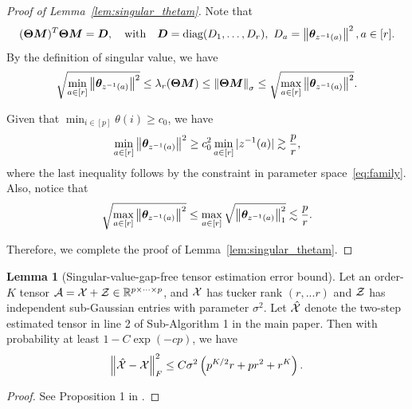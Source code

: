 \documentclass[lettersize,journal]{IEEEtran}
\theoremstyle{definition}
\newtheorem{lem}{Lemma}
\theoremstyle{definition}
\newcommand{\of}[1]{\left(#1\right)}
\begin{document}
\begin{proof}[Proof of Lemma~\ref{lem:singular_thetam}] Note that 
\begin{equation}
    (\boldsymbol{\Theta}\bm M)^T \boldsymbol{\Theta} \bm M = \bm{D}, \quad \text{with} \quad \bm{D} = \text{diag}(D_1,\ldots, D_r), \ D_a = \left\lVert\boldsymbol{\theta}_{z^{-1}(a)}\right\rVert^2, a \in [r].
\end{equation}
By the definition of singular value, we have 
\begin{equation}
     \sqrt{\min_{a \in [r]}\left\lVert \boldsymbol{\theta}_{ z^{-1}(a)} \right\rVert^2 } \leq \lambda_r(\boldsymbol{\Theta} \bm M) \leq \left\lVert\boldsymbol{\Theta}\bm M\right\rVert_{\sigma} \leq \sqrt{ \max_{a \in [r]}\left\lVert \boldsymbol{\theta}_{ z^{-1}(a)} \right\rVert^2}.
\end{equation}


Given that $\min_{i \in [p]}\theta(i) \geq c_0$, we have  
\begin{equation}
   \min_{a \in [r]} \left\lVert \boldsymbol{\theta}_{ z^{-1}(a)} \right\rVert^2 \geq c_0^2 \min_{a \in [r]} |z^{-1}(a)| \gtrsim \frac{p}{r},
\end{equation}
where the last inequality follows by the constraint in parameter space~\eqref{eq:family}. Also, notice that 
\begin{equation}
    \sqrt{\max_{a \in [r]}\left\lVert \boldsymbol{\theta}_{ z^{-1}(a)} \right\rVert^2 } \leq \max_{a \in [r]} \sqrt{ \left\lVert \boldsymbol{\theta}_{ z^{-1}(a)} \right\rVert^2_1} \lesssim \frac{p}{r}.
\end{equation}

 Therefore, we complete the proof of Lemma~\ref{lem:singular_thetam}.
\end{proof}


\begin{lem}[Singular-value-gap-free tensor estimation error bound]\label{lem:two-step_esterror} Let an order-$K$ tensor $\mathcal{A} = \mathcal{X} + \mathcal{Z} \in \mathbb{R}^{p \times \cdots \times p}$, and $\mathcal{X}$ has tucker rank $(r,...r)$ and $\mathcal{Z}$ has independent sub-Gaussian entries with parameter $\sigma^2$. Let $\hat {\mathcal{X}}$ denote the two-step estimated tensor in line 2 of Sub-Algorithm 1 in the main paper. Then with probability at least $1 - C \exp\of{- cp }$, we have
\begin{align}
    \onorm{\hat \tX - \tX}_F^2 \leq C \sigma^2 \of{ p^{K/2}r + pr^2 + r^K }.
\end{align}
\end{lem}

\begin{proof}
See Proposition 1 in \cite{han2020exact}.
\end{proof}
\end{document}
